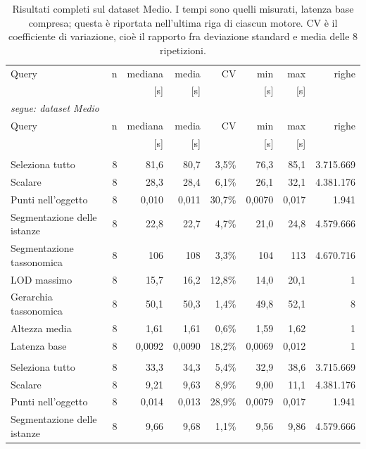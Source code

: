\begin{small}
\begin{longtable}{lrrrrrr r}
\caption{Risultati completi sul dataset Medio. I tempi sono quelli misurati, latenza base compresa; questa è riportata nell'ultima riga di ciascun motore. CV è il coefficiente di variazione, cioè il rapporto fra deviazione standard e media delle 8 ripetizioni.}\label{tab:raw_torre_modena}\\
\toprule
Query & n & mediana & media & CV & min & max & righe \\
 & & [s] & [s] & & [s] & [s] & \\
\midrule
\endfirsthead
\multicolumn{8}{l}{\small\itshape segue: dataset Medio}\\
\toprule
Query & n & mediana & media & CV & min & max & righe \\
 & & [s] & [s] & & [s] & [s] & \\
\midrule
\endhead
\endfoot
\bottomrule
\endlastfoot
\multicolumn{8}{l}{\textbf{Fuseki}}\\
\quad Seleziona tutto & 8 & 81,6 & 80,7 & 3,5\% & 76,3 & 85,1 & 3.715.669 \\
\quad Scalare & 8 & 28,3 & 28,4 & 6,1\% & 26,1 & 32,1 & 4.381.176 \\
\quad Punti nell'oggetto & 8 & 0,010 & 0,011 & 30,7\% & 0,0070 & 0,017 & 1.941 \\
\quad Segmentazione delle istanze & 8 & 22,8 & 22,7 & 4,7\% & 21,0 & 24,8 & 4.579.666 \\
\quad Segmentazione tassonomica & 8 & 106 & 108 & 3,3\% & 104 & 113 & 4.670.716 \\
\quad LOD massimo & 8 & 15,7 & 16,2 & 12,8\% & 14,0 & 20,1 & 1 \\
\quad Gerarchia tassonomica & 8 & 50,1 & 50,3 & 1,4\% & 49,8 & 52,1 & 8 \\
\quad Altezza media & 8 & 1,61 & 1,61 & 0,6\% & 1,59 & 1,62 & 1 \\
\quad Latenza base & 8 & 0,0092 & 0,0090 & 18,2\% & 0,0069 & 0,012 & 1 \\
\addlinespace
\multicolumn{8}{l}{\textbf{GraphDB}}\\
\quad Seleziona tutto & 8 & 33,3 & 34,3 & 5,4\% & 32,9 & 38,6 & 3.715.669 \\
\quad Scalare & 8 & 9,21 & 9,63 & 8,9\% & 9,00 & 11,1 & 4.381.176 \\
\quad Punti nell'oggetto & 8 & 0,014 & 0,013 & 28,9\% & 0,0079 & 0,017 & 1.941 \\
\quad Segmentazione delle istanze & 8 & 9,66 & 9,68 & 1,1\% & 9,56 & 9,86 & 4.579.666 \\

\end{longtable}
\end{small}
